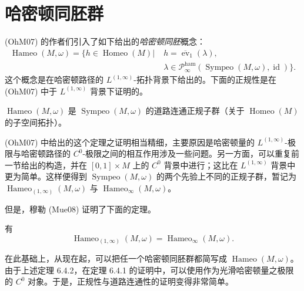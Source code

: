 \section{哈密顿同胚群}
\label{sec:hameomorphism-group}

(OhM07) 的作者们引入了如下给出的\emph{哈密顿同胚}概念：
\begin{equation}
\begin{split}
 \operatorname{Hameo}(M,\omega)
 =\bigl\{h\in\operatorname{Homeo}(M)\mathrel{\big|}\;&
 h=\overline{\operatorname{ev}}_1(\lambda),\\
 &\lambda\in\mathcal P_\infty^{\mathrm{ham}}
 (\operatorname{Sympeo}(M,\omega),\operatorname{id})\bigr\}.
\end{split}
 \label{eq:hameomorphism-group}
\end{equation}
这个概念是在哈密顿路径的 $L^{(1,\infty)}$-拓扑背景下给出的。下面的正规性是在 (OhM07) 中于
$L^{(1,\infty)}$ 背景下证明的。

\begin{theorem}\label{thm:hameomorphism-normal-path-connected}
$\operatorname{Hameo}(M,\omega)$ 是
$\operatorname{Sympeo}(M,\omega)$ 的道路连通正规子群（关于
$\operatorname{Homeo}(M)$ 的子空间拓扑）。
\end{theorem}

(OhM07) 中给出的这个定理之证明相当精细，主要原因是哈密顿量的
$L^{(1,\infty)}$-极限与哈密顿路径的 $C^0$-极限之间的相互作用涉及一些问题。另一方面，可以重复前一节给出的构造，并在
$[0,1]\times M$ 上的 $C^0$ 背景中进行；这比在
$L^{(1,\infty)}$ 背景中更为简单。这样便得到
$\operatorname{Sympeo}(M,\omega)$ 的两个先验上不同的正规子群，暂记为
$\operatorname{Hameo}_{(1,\infty)}(M,\omega)$ 与
$\operatorname{Hameo}_\infty(M,\omega)$。

但是，穆勒 (Mue08) 证明了下面的定理。

\begin{theorem}[穆勒]\label{thm:hameomorphism-topologies-agree}
有
\[
 \operatorname{Hameo}_{(1,\infty)}(M,\omega)
 =\operatorname{Hameo}_\infty(M,\omega).
\]
\end{theorem}

在此基础上，从现在起，可以把任一个哈密顿同胚群都简写成
$\operatorname{Hameo}(M,\omega)$。由于上述定理 6.4.2，在定理
6.4.1 的证明中，可以使用作为光滑哈密顿量之极限的
$C^0$ 对象。于是，正规性与道路连通性的证明变得非常简单。


